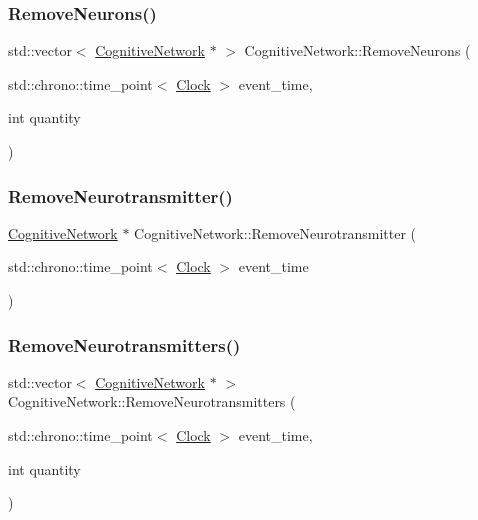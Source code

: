 \mbox{\label{classCognitiveNetwork_a130985ff0aa14b2a17fc2c589e65f868}} 
\subsubsection{\texorpdfstring{Remove\+Neurons()}{RemoveNeurons()}}
{\footnotesize\ttfamily std\+::vector$<$ \mbox{\hyperlink{classCognitiveNetwork}{Cognitive\+Network}} $\ast$ $>$ Cognitive\+Network\+::\+Remove\+Neurons (\begin{DoxyParamCaption}\item[{std\+::chrono\+::time\+\_\+point$<$ \mbox{\hyperlink{universe_8h_a0ef8d951d1ca5ab3cfaf7ab4c7a6fd80}{Clock}} $>$}]{event\+\_\+time,  }\item[{int}]{quantity }\end{DoxyParamCaption})}

\mbox{\label{classCognitiveNetwork_ac0728c12a6d4bb87b6e8c9163435c8e6}} 
\subsubsection{\texorpdfstring{Remove\+Neurotransmitter()}{RemoveNeurotransmitter()}}
{\footnotesize\ttfamily \mbox{\hyperlink{classCognitiveNetwork}{Cognitive\+Network}} $\ast$ Cognitive\+Network\+::\+Remove\+Neurotransmitter (\begin{DoxyParamCaption}\item[{std\+::chrono\+::time\+\_\+point$<$ \mbox{\hyperlink{universe_8h_a0ef8d951d1ca5ab3cfaf7ab4c7a6fd80}{Clock}} $>$}]{event\+\_\+time }\end{DoxyParamCaption})}

\mbox{\label{classCognitiveNetwork_a5e706084296ce84ff6884c1506213b03}} 
\subsubsection{\texorpdfstring{Remove\+Neurotransmitters()}{RemoveNeurotransmitters()}}
{\footnotesize\ttfamily std\+::vector$<$ \mbox{\hyperlink{classCognitiveNetwork}{Cognitive\+Network}} $\ast$ $>$ Cognitive\+Network\+::\+Remove\+Neurotransmitters (\begin{DoxyParamCaption}\item[{std\+::chrono\+::time\+\_\+point$<$ \mbox{\hyperlink{universe_8h_a0ef8d951d1ca5ab3cfaf7ab4c7a6fd80}{Clock}} $>$}]{event\+\_\+time,  }\item[{int}]{quantity }\end{DoxyParamCaption})}

